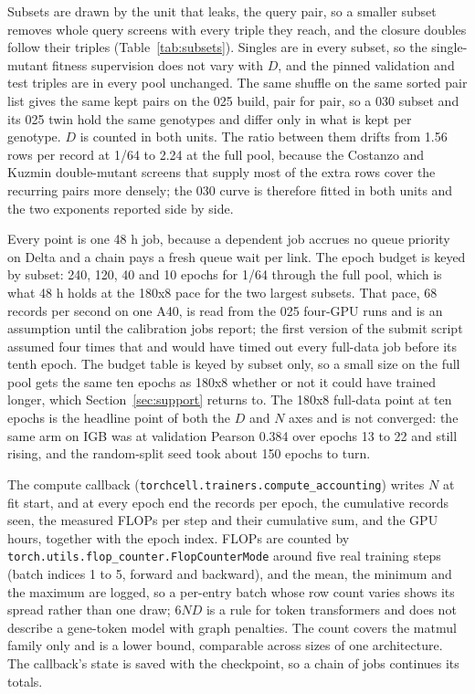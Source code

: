 

Subsets are drawn by the unit that leaks, the query pair, so a smaller subset
removes whole query screens with every triple they reach, and the closure doubles
follow their triples (Table~\ref{tab:subsets}). Singles are in every subset, so
the single-mutant fitness supervision does not vary with $D$, and the pinned
validation and test triples are in every pool unchanged. The same shuffle on the
same sorted pair list gives the same kept pairs on the 025 build, pair for pair,
so a 030 subset and its 025 twin hold the same genotypes and differ only in what
is kept per genotype. $D$ is counted in both units. The ratio between them
drifts from 1.56 rows per record at 1/64 to 2.24 at the full pool, because the
Costanzo and Kuzmin double-mutant screens that supply most of the extra rows
cover the recurring pairs more densely; the 030 curve is therefore fitted in
both units and the two exponents reported side by side.



Every point is one 48 h job, because a dependent job accrues no queue priority
on Delta and a chain pays a fresh queue wait per link. The epoch budget is keyed
by subset: 240, 120, 40 and 10 epochs for 1/64 through the full pool, which is
what 48 h holds at the 180x8 pace for the two largest subsets. That pace, 68
records per second on one A40, is read from the 025 four-GPU runs and is an
assumption until the calibration jobs report; the first version of the submit
script assumed four times that and would have timed out every full-data job
before its tenth epoch. The budget table is keyed by subset only, so a small size
on the full pool gets the same ten epochs as 180x8 whether or not it could have
trained longer, which Section~\ref{sec:support} returns to. The 180x8 full-data
point at ten epochs is the headline point of both the $D$ and $N$ axes and is
not converged: the same arm on IGB was at validation Pearson 0.384 over epochs 13
to 22 and still rising, and the random-split seed took about 150 epochs to turn.

The compute callback (\texttt{torchcell.trainers.compute\_accounting}) writes
$N$ at fit start, and at every epoch end the records per epoch, the cumulative
records seen, the measured FLOPs per step and their cumulative sum, and the GPU
hours, together with the epoch index. FLOPs are counted by
\texttt{torch.utils.flop\_counter.FlopCounterMode} around five real training
steps (batch indices 1 to 5, forward and backward), and the mean, the minimum and
the maximum are logged, so a per-entry batch whose row count varies shows its
spread rather than one draw; $6ND$ is a rule for token transformers and does not
describe a gene-token model with graph penalties. The count covers the matmul
family only and is a lower bound, comparable across sizes of one architecture.
The callback's state is saved with the checkpoint, so a chain of jobs continues
its totals.


